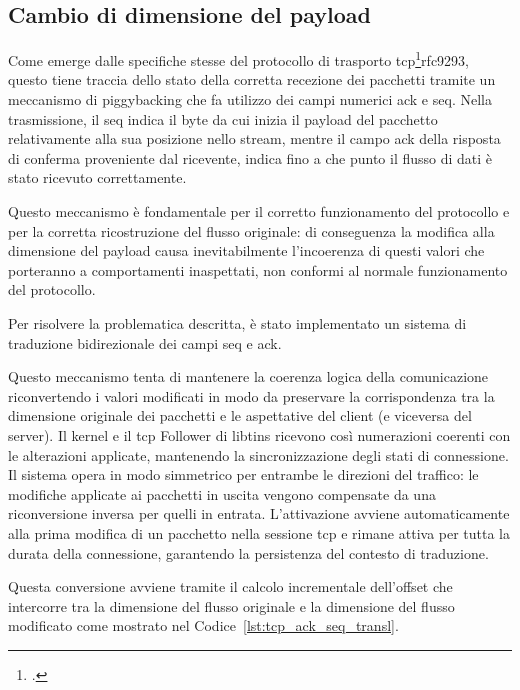 \subsection{Cambio di dimensione del payload}

Come emerge dalle specifiche stesse del protocollo di trasporto \gls{tcp}\footcite{RFC9293, Transmission Control Protocol (TCP)}{rfc9293}, questo tiene traccia dello stato della corretta recezione dei pacchetti tramite un meccanismo di piggybacking che fa utilizzo dei campi numerici \gls{ack} e \gls{seq}.
Nella trasmissione, il \gls{seq} indica il byte da cui inizia il payload del pacchetto relativamente alla sua posizione nello stream, mentre il campo \gls{ack} della risposta di conferma proveniente dal ricevente, indica fino a che punto il flusso di dati è stato ricevuto correttamente.

Questo meccanismo è fondamentale per il corretto funzionamento del protocollo e per la corretta ricostruzione del flusso originale: di conseguenza la modifica alla dimensione del payload causa inevitabilmente l'incoerenza di questi valori che porteranno a comportamenti inaspettati, non conformi al normale funzionamento del protocollo.

Per risolvere la problematica descritta, è stato implementato un sistema di traduzione bidirezionale dei campi \gls{seq} e \gls{ack}.

Questo meccanismo tenta di mantenere la coerenza logica della comunicazione riconvertendo i valori modificati in modo da preservare la corrispondenza tra la dimensione originale dei pacchetti e le aspettative del client (e viceversa del server).
Il kernel e il \gls{tcp} Follower di libtins ricevono così numerazioni coerenti con le alterazioni applicate, mantenendo la sincronizzazione degli stati di connessione.
Il sistema opera in modo simmetrico per entrambe le direzioni del traffico: le modifiche applicate ai pacchetti in uscita vengono compensate da una riconversione inversa per quelli in entrata. L'attivazione avviene automaticamente alla prima modifica di un pacchetto nella sessione \gls{tcp} e rimane attiva per tutta la durata della connessione, garantendo la persistenza del contesto di traduzione.

Questa conversione avviene tramite il calcolo incrementale dell'offset che intercorre tra la dimensione del flusso originale e la dimensione del flusso modificato come mostrato nel Codice~\ref{lst:tcp_ack_seq_transl}.

